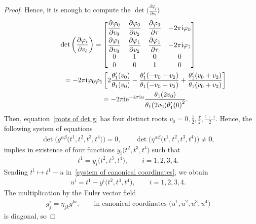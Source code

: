 \documentclass[10pt,a4paper]{amsart}
\numberwithin{equation}{section}
\begin{document}
\begin{proof}
Hence, it is enough to compute the $\det\big(\frac{\partial\varphi_i}{\partial v_l}\big)$
\begin{gather}
\det\left(\frac{\partial\varphi_i}{\partial v_l} \right)=
\begin{bmatrix}
 \dfrac{\partial\varphi_0}{\partial v_0} & \dfrac{\partial\varphi_0}{\partial v_2} & \dfrac{\partial\varphi_0}{\partial \tau}&-2\pi {\rm i}\varphi_0 \vspace{1mm}\\
 \dfrac{\partial\varphi_1}{\partial v_0} & \dfrac{\partial\varphi_1}{\partial v_2} & \dfrac{\partial\varphi_1}{\partial \tau} &-2\pi {\rm i}\varphi_1 \\
 0& 1 &0 & 0 \\
 0& 0 & 1&0
\end{bmatrix}\nonumber
\\ \hphantom{\det\left(\frac{\partial\varphi_i}{\partial v_l} \right)}
{}=-2\pi {\rm i} \varphi_0\varphi_1\left[2\frac{\theta_1^{\prime}(v_0)}{\theta_1(v_0)} -\frac{\theta_1^{\prime}(-v_0+v_2)}{\theta_1(-v_0+v_2)} +\frac{\theta_1^{\prime}(v_0+v_2)}{\theta_1(v_0+v_2)} \right]\nonumber
\\ \hphantom{\det\left(\frac{\partial\varphi_i}{\partial v_l} \right)}
= -2\pi {\rm i} {\rm e}^{-4\pi {\rm i} u}\frac{\theta_1(2v_0)}{\theta_1(2v_2){\theta_1^{\prime}(0)}^2}.\label{roots of det g}
\end{gather}
Then, equation~\eqref{roots of det g} has four distinct roots $v_0=0,\frac{1}{2},\frac{\tau}{2},\frac{1+\tau}{2}$. Hence, the following system of equations
\begin{gather}\label{system of canonical coordinates}
\det \big( g^{\alpha\beta}\big(t^1,t^2,t^3,t^4\big)\big)=0,\qquad
\det \big(\eta^{\alpha\beta}\big(t^1,t^2,t^3,t^4\big)\big)\neq 0,
\end{gather}
implies in existence of four functions $y_i\big(t^2,t^3,t^4\big)$ such that
\begin{gather*}
t^1=y_i\big(t^2,t^3,t^4\big), \qquad i=1,2,3,4.
\end{gather*}
Sending $t^1\mapsto t^1-u$ in~\eqref{system of canonical coordinates}, we obtain
\begin{gather*}
u^i=t^1-y^i\big(t^2,t^3,t^4\big), \qquad i=1,2,3,4.
\end{gather*}
The multiplication by the Euler vector field
\begin{gather*}
g^{i}_j=\eta_{jk}g^{ki},\qquad \text{in canonical coordinates } \big(u^1,u^2,u^3,u^4\big)
\end{gather*}
 is diagonal, so

\end{proof}
\end{document}
